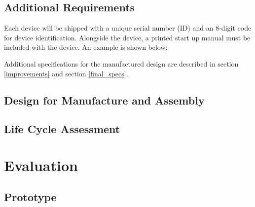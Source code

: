 \documentclass{article}
\begin{document}



















\subsection{Additional Requirements}
Each device will be shipped with a unique serial number (ID) and an 8-digit code for device identification.
Alongside the device, a printed start up manual must be included with the device. An example is shown below:


Additional specifications for the manufactured design are described in section \ref{improvements} and section \ref{final_specs}.
\newpage

\subsection{Design for Manufacture and Assembly} \label{DMA}

\subsection{Life Cycle Assessment}


\newpage

\section{Evaluation} \label{eval}

\subsection{Prototype}



\end{document}
